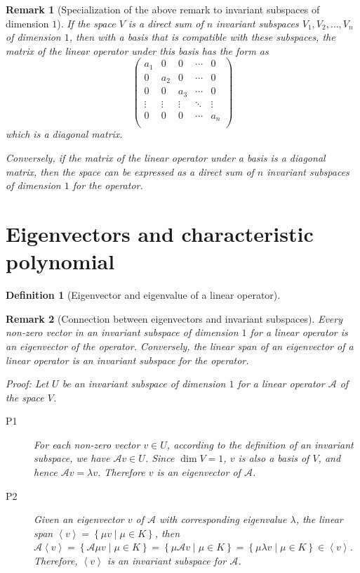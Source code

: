 \documentclass[onecolumn]{ctexart}
\newtheorem{definition}{Definition}
\newtheorem{remark}{Remark}
\begin{document}
\begin{remark}[Specialization of the above remark to invariant subspaces of dimension $1$]
  If the space $V$ is a direct sum of $n$ invariant subspaces $V_1, V_2, \ldots, V_n$ of dimension $1$, then with a basis that is compatible with these subspaces, the matrix of the linear operator under this basis has the form as
  \[
    \begin{pmatrix}
      a_1 & 0 & 0 & \cdots & 0 \\
      0 & a_2 & 0 & \cdots & 0 \\
      0 & 0 & a_3 & \cdots & 0 \\
      \vdots & \vdots & \vdots & \ddots & \vdots \\
      0 & 0 & 0 & \cdots & a_n \\
    \end{pmatrix}
  \]
  which is a diagonal matrix.

  Conversely, if the matrix of the linear operator under a basis is a diagonal 
  matrix, then the space can be expressed as a direct sum of $n$ invariant 
  subspaces of dimension $1$ for the operator.
\end{remark}

\section{Eigenvectors and characteristic polynomial}

\begin{definition}[Eigenvector and eigenvalue of a linear operator]
  
\end{definition}

\begin{remark}[Connection between eigenvectors and invariant subspaces]
  Every non-zero vector in an invariant subspace of dimension $1$ for a linear 
  operator is an eigenvector of the operator. Conversely, the linear span of an 
  eigenvector of a linear operator is an invariant subspace for the operator.

  Proof: Let $U$ be an invariant subspace of dimension $1$ for a linear operator $\mathcal{A}$ of the space $V$.
  \begin{description}
    \item[P1] For each non-zero vector $v \in U$, according to the definition of 
    an invariant subspace, we have $\mathcal{A}v \in U$. Since $\dim V = 1$, $v$ 
    is also a basis of $V$, and hence $\mathcal{A}v = \lambda v$. Therefore $v$ 
    is an eigenvector of $\mathcal{A}$.
    \item[P2] Given an eigenvector $v$ of $\mathcal{A}$ with corresponding 
    eigenvalue $\lambda$, the linear span $\left\langle v \right\rangle = \left\{ 
    \mu v \mid \mu \in K \right\}$, then $\mathcal{A}\left\langle v \right\rangle 
    = \left\{ \mathcal{A} \mu v \mid \mu \in K\right\} = \left\{ \mu \mathcal{A} 
    v \mid \mu \in K\right\} =  \left\{ \mu \lambda v \mid \mu \in K\right\} \in 
    \left\langle v \right\rangle$. Therefore, $\left\langle v \right\rangle$ is 
    an invariant subspace for $\mathcal{A}$.
  \end{description}
\end{remark}
\end{document}

